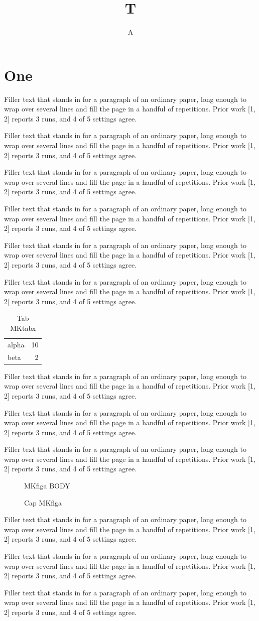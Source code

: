 \documentclass[titlepage]{article}
\title{T}\author{A}
\newcommand\para{Filler text that stands in for a paragraph of an ordinary paper, long enough to wrap over several lines and fill the page in a handful of repetitions. Prior work [1, 2] reports 3 runs, and 4 of 5 settings agree.\par}
\begin{document}
\maketitle
\section{One}
\para\para\para\para\para\para
\begin{table}[b]\centering\caption{Tab MKtabx}\label{tab:x}\begin{tabular}{lr}alpha & 10\\ beta & 2\end{tabular}\end{table}
\clearpage
\para\para\para
\begin{figure}[h]\centering MKfiga BODY\caption{Cap MKfiga}\label{fig:a}\end{figure}
\para\para\para
\end{document}
